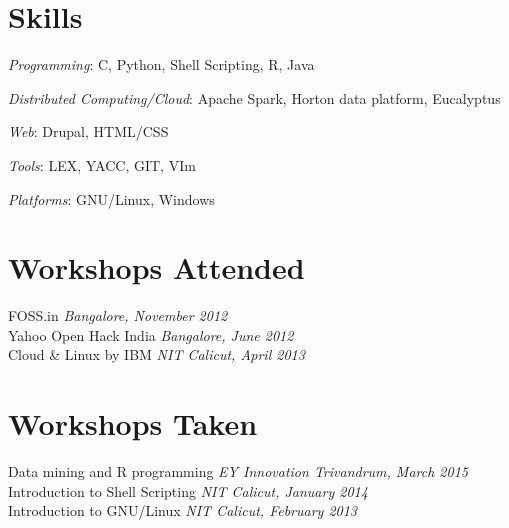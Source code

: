 \documentclass[margin,line]{resume}
\begin{document}
\begin{resume}
   \section{\mysidestyle Skills} 
    	\begin{list2}
	\item \textit{Programming}: C, Python, Shell Scripting, R, Java
	\item \textit{Distributed Computing/Cloud}: Apache Spark, Horton data platform, Eucalyptus	
	\item \textit{Web}: Drupal, HTML/CSS	
	\item \textit{Tools}: LEX, YACC, GIT, VIm
	
	\item \textit{Platforms}: GNU/Linux, Windows
	\end{list2}


    \section{\mysidestyle Workshops Attended} 
	FOSS.in \hfill \textit{Bangalore, November 2012}  \\%
    Yahoo Open Hack India \hfill \textit{Bangalore, June 2012}    \\
    Cloud \& Linux by IBM \hfill \textit{NIT Calicut, April 2013}    \\

            


    \section{\mysidestyle Workshops Taken} 
	Data mining and R programming \hfill \textit{EY Innovation Trivandrum, March 2015}    \\
	Introduction to Shell Scripting \hfill \textit{NIT Calicut, January 2014}    \\    	
	Introduction to GNU/Linux \hfill \textit{NIT Calicut, February 2013}    \\
		    			


\end{resume}
\end{document}
